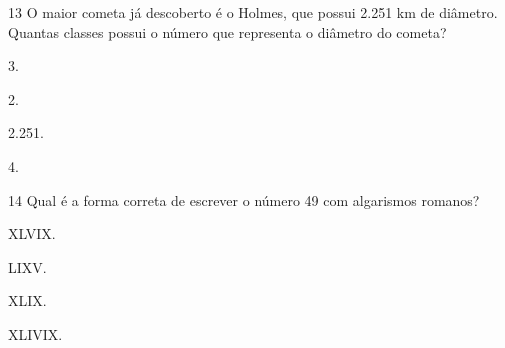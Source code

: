 \num{13} O maior cometa já descoberto é o Holmes, que possui 2.251 km de
diâmetro. Quantas classes possui o número que representa o diâmetro do
cometa?

\begin{escolha}
\item 3.
\item 2.
\item 2.251.
\item 4.
\end{escolha}






\num{14} Qual é a forma correta de escrever o número 49 com algarismos romanos?

\begin{escolha}
\item XLVIX.
\item LIXV.
\item XLIX.
\item XLIVIX.
\end{escolha}




